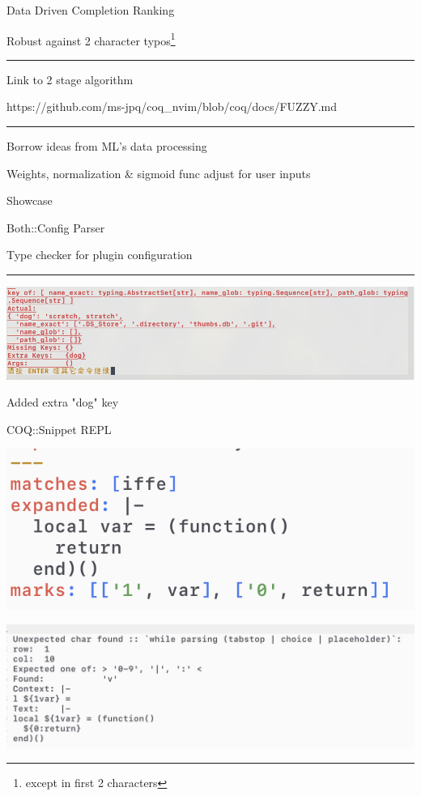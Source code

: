 \documentclass{beamer}
\begin{document}
\begin{frame}{Data Driven Completion Ranking}

	Robust against 2 character typos\footnote{except in first 2 characters}

	\rule{\textwidth}{0.1em}

	Link to 2 stage algorithm

	https://github.com/ms-jpq/coq\_nvim/blob/coq/docs/FUZZY.md

	\rule{\textwidth}{0.1em}

	Borrow ideas from ML's data processing

	Weights, normalization \& sigmoid func adjust for user inputs

\end{frame}


\begin{frame}[standout]

	Showcase

\end{frame}


\begin{frame}{Both::Config Parser}

	Type checker for plugin configuration

	\rule{\textwidth}{0.1em}

	\includegraphics[width=\textwidth]{conf_parser}

	Added extra "dog" key

\end{frame}


\begin{frame}{COQ::Snippet REPL}

	\includegraphics[width=\textwidth]{repl_succ}

	\includegraphics[width=\textwidth]{repl_fail}

\end{frame}
\end{document}
